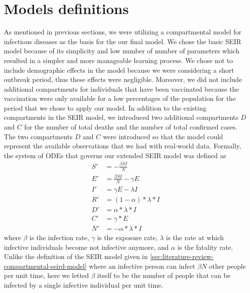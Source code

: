 \section{Models definitions}
\label{sec:methodologies-models-definitions}

As mentioned in previous sections, we were utilizing a compartmental model for infectious diseases as the basis for the our final model.
We chose the basic \gls{SEIR} model because of its simplicity and low number of number of parameters which resulted in a simpler and more manageable learning process.
We chose not to include demographic effects in the model because we were considering a short outbreak period, thus these effects were negligible.
Moreover, we did not include additional compartments for individuals that have been vaccinated because the vaccination were only available for a low percentages of the population for the period that we chose to apply our model.
In addition to the existing compartments in the \gls{SEIR} model, we introduced two additional compartments $D$ and $C$ for the number of total deaths and the number of total confirmed cases.
The two compartments $D$ and $C$ were introduced so that the model could represent the available observations that we had with real-world data.
Formally, the system of \glspl{ODE} that governs our extended \gls{SEIR} model was defined as
\begin{equation}
    \begin{aligned}
        S' &= - \frac{\beta SI}{N} \\
        E' &= \frac{\beta SI}{N} - \gamma E \\
        I' &= \gamma E - \lambda I \\
        R' &= (1 - \alpha) * \lambda * I \\
        D' &= \alpha * \lambda * I \\
        C' &= \gamma * E \\
        N' &= - \alpha * \lambda * I
    \end{aligned}
    \label{eq:methodologies-seir-model}
\end{equation}
where $\beta$ is the infection rate, $\gamma$ is the exposure rate, $\lambda$ is the rate at which infective individuals become not infective anymore, and $\alpha$ is the fatality rate.
Unlike the definition of the \gls{SEIR} model given in \autoref{sec:literature-review-compartmental-seird-model} where an infective person can infect $\beta N$ other people per unit time, here we letted $\beta$ itself to be the number of people that can be infected by a single infective individual per unit time.
